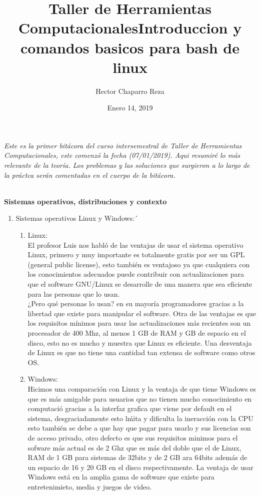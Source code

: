 \documentclass[letterpaper, 12pt, oneside]{article}
\title{\Huge{Taller de Herramientas Computacionales}}
\author{Hector Chaparro Reza}
\date{Enero 14, 2019}
\begin{document}
	\maketitle
	\it Este es la primer bit\'acora del curso intersemestral de Taller de Herramientas Computacionales, este comenz\'o la fecha (07/01/2019). Aqui resumir\'e lo m\'as relevante de la teor\'ia. Los problemas y las soluciones que surgieron a lo largo de la pr\'actca ser\'an comentadas en el cuerpo de la bit\'acora.
	\newpage
	
	\title{\Huge{Introduccion y comandos basicos para bash de linux}}\\
	
	\textbf{Sistemas operativos, distribuciones y contexto}\\
	
	\begin{enumerate}
		\item {Sistemas operativos Linux y Windows:´}
		\begin{enumerate}
			\item Linux:\\
			El profesor Luis nos habl\'o de las ventajas de usar el sistema operativo Linux, primero y muy importante es totalmente gratis por ser un GPL (general public license), esto tambi\'en es ventajoso ya que cualquiera con los conocimientos adecuados puede contribuir con actualizaciones para que el software GNU/Linux se desarrolle de una manera que sea eficiente para las personas que lo usan.\\
			¿Pero qu\'e personas lo usan? en su mayor\'ia programadores gracias a la libertad que existe para manipular el software. Otra de las ventajas es que los requisitos m\'inimos para usar las actualizaciones m\'as recientes son un procesador de 400 Mhz, al menos 1 GB de RAM y  GB de espacio en el disco, esto no es mucho y muestra que Linux es eficiente. Una desventaja de Linux es que no tiene una cantidad tan extensa de software como otros OS.\\
			
			\item Windows:\\
			Hicimos una comparaci\'on con Linux y la ventaja de que tiene Windows es que es m\'as amigable para usuarios que no tienen mucho conocimiento en computaci\'o gracias a la interfaz grafica que viene por default en el sistema, desgraciadamente esto l\'mita y dificulta la ineracci\'on con la CPU esto tambi\'en se debe a que hay que pagar para usarlo y sus licencias son de acceso privado, otro defecto es que sus requisitos minimos para el sofware m\'as actual es de 2 Ghz que es m\'as del doble que el de Linux, RAM de 1 GB para sistemas de 32bits y de 2 GB ara 64bits adem\'as de un espacio de 16 y 20 GB en el disco respectivamente. La ventaja de usar Windows est\'a en la amplia gama de software que existe para entretenimieto, media y juegos de video.\\
		\end{enumerate}
	

\end{enumerate}
\end{document}
